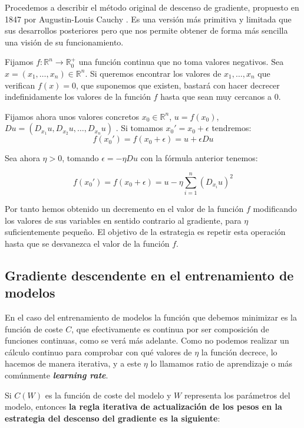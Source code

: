 Procedemos a describir el método original de descenso de gradiente, propuesto en 1847 por Augustin-Louis Cauchy \cite{CauchyGD}. Es una versión más primitiva y limitada que sus desarrollos posteriores pero que nos permite obtener de forma más sencilla una visión de su funcionamiento. 

Fijamos $f:\mathbb{R}^n \rightarrow \mathbb{R}_{0}^{+}$ una función continua que no toma valores negativos. Sea $x= \left ( x_1,\ldots,x_n \right ) \in \mathbb{R}^n$. Si queremos encontrar los valores de $x_1,\ldots,x_n$ que verifican $f(x)=0$, que suponemos que existen, bastará con hacer decrecer indefinidamente los valores de la función $f$ hasta que sean muy cercanos a $0$. 

Fijamos ahora unos valores concretos $x_0 \in \mathbb{R}^n$, $u=f(x_0)$,\\ $Du= \left ( D_{x_1}u, D_{x_2}u, \ldots, D_{x_n}u \right )$ . Si tomamos $x_0'=x_0+\epsilon$ tendremos:
$$f(x_0')= f(x_0 + \epsilon) = u + \epsilon Du$$

Sea ahora $\eta >0$, tomando $\epsilon= - \eta Du$ con la fórmula anterior tenemos: 

$$f(x_0') = f(x_0 + \epsilon) = u - \eta \sum_{i=1}^{n}(D_{x_i}u)^2$$

Por tanto hemos obtenido un decremento en el valor de la función $f$ modificando los valores de sus variables en sentido contrario al gradiente, para $\eta$ suficientemente pequeño. El objetivo de la estrategia es repetir esta operación hasta que se desvanezca el valor de la función $f$.




\subsection{Gradiente descendente en el entrenamiento de modelos}

En el caso del entrenamiento de modelos la función que debemos minimizar es la función de coste $C$, que efectivamente es continua por ser composición de funciones continuas, como se verá más adelante. Como no podemos realizar un cálculo continuo para comprobar con qué valores de $\eta$ la función decrece, lo hacemos de manera iterativa, y a este $\eta$ lo llamamos ratio de aprendizaje o más comúnmente \textbf{\textit{learning rate}}. 

Si $C(W)$ es la función de coste del modelo y $W$ representa los parámetros del modelo, entonces\textbf{ la regla iterativa de actualización de los pesos en la estrategia del descenso del gradiente es la siguiente}:

